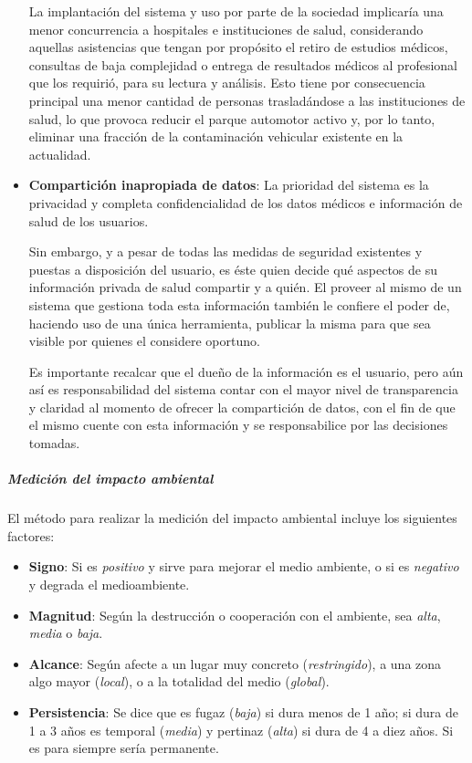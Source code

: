 \begin{itemize}
    La implantación del sistema y uso por parte de la sociedad implicaría una menor concurrencia a hospitales e instituciones de salud, considerando aquellas asistencias que tengan por propósito el retiro de estudios médicos, consultas de baja complejidad o entrega de resultados médicos al profesional que los requirió, para su lectura y análisis.
    Esto tiene por consecuencia principal una menor cantidad de personas trasladándose a las instituciones de salud, lo que provoca reducir el parque automotor activo y, por lo tanto, eliminar una fracción de la contaminación vehicular existente en la actualidad.
    
    
    \item \textbf{Compartición inapropiada de datos}:
    La prioridad del sistema es la privacidad y completa confidencialidad de los datos médicos e información de salud de los usuarios.
    
    Sin embargo, y a pesar de todas las medidas de seguridad existentes y puestas a disposición del usuario, es éste quien decide qué aspectos de su información privada de salud compartir y a quién.
    El proveer al mismo de un sistema que gestiona toda esta información también le confiere el poder de, haciendo uso de una única herramienta, publicar la misma para que sea visible por quienes el considere oportuno.
    
    Es importante recalcar que el dueño de la información es el usuario, pero aún así es responsabilidad del sistema contar con el mayor nivel de transparencia y claridad al momento de ofrecer la compartición de datos, con el fin de que el mismo cuente con esta información y se responsabilice por las decisiones tomadas.
\end{itemize}


\subparagraph{Medición del impacto ambiental}

El método para realizar la medición del impacto ambiental incluye los siguientes factores:

\begin{itemize}
    \item \textbf{Signo}:
    Si es \textit{positivo} y sirve para mejorar el medio ambiente, o si es \textit{negativo} y degrada el medioambiente.
    
    \item \textbf{Magnitud}:
    Según la destrucción o cooperación con el ambiente, sea \textit{alta}, \textit{media} o \textit{baja}.
    
    \item \textbf{Alcance}:
    Según afecte a un lugar muy concreto (\textit{restringido}), a una zona algo mayor (\textit{local}), o a la totalidad del medio (\textit{global}).
    
    \item \textbf{Persistencia}:
    Se dice que es fugaz (\textit{baja}) si dura menos de 1 año; si dura de 1 a 3 años es temporal (\textit{media}) y pertinaz (\textit{alta}) si dura de 4 a diez años.
    Si es para siempre sería permanente.
\end{itemize}


